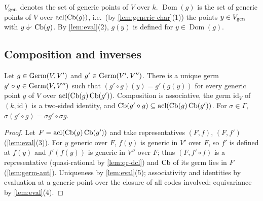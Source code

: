 \begin{definition}\label{def:dom}
$V_{\operatorname{gen}}$ denotes the set of generic points of $V$ over $k$.
$\operatorname{Dom}(g)$ is the set of generic points of $V$ over $\operatorname{acl}(\operatorname{Cb}(g))$,
i.e.\ (by \cref{lem:generic-char}(1)) the points $y\in V_{\operatorname{gen}}$ with
$y\ind{}\Cb(g)$.  By \cref{lem:eval}(2), $g(y)$ is defined for $y\in\operatorname{Dom}(g)$.
\end{definition}

\subsection{Composition and inverses}

\begin{lemma}[composition]\label{lem:comp}
Let $g\in\operatorname{Germ}(V,V')$ and $g'\in\operatorname{Germ}(V',V'')$.  There is a unique germ
$g'\circ g\in\operatorname{Germ}(V,V'')$ such that $(g'\circ g)(y)=g'(g(y))$ for every generic point
$y$ of $V$ over $\operatorname{acl}(\operatorname{Cb}(g)\operatorname{Cb}(g'))$.  Composition is associative, the germ
$\mathrm{id}_V$ of $(k,\mathrm{id})$ is a two-sided identity, and
$\operatorname{Cb}(g'\circ g)\subseteq\operatorname{acl}(\operatorname{Cb}(g)\operatorname{Cb}(g'))$.  For $\sigma\in\Gamma$,
$\sigma(g'\circ g)=\sigma g'\circ\sigma g$.
\end{lemma}
\begin{proof}
Let $F=\operatorname{acl}(\operatorname{Cb}(g)\operatorname{Cb}(g'))$ and take representatives $(F,f)$, $(F,f')$
(\cref{lem:eval}(3)).  For $y$ generic over $F$, $f(y)$ is generic in $V'$ over $F$,
so $f'$ is defined at $f(y)$ and $f'(f(y))$ is generic in $V''$ over $F$; thus
$(F,f'\circ f)$ is a representative (quasi-rational by \cref{lem:qr-dcl}) and
$\operatorname{Cb}$ of its germ lies in $F$ (\cref{lem:germ-aut}).  Uniqueness by \cref{lem:eval}(5);
associativity and identities by evaluation at a generic point over the closure of all
codes involved; equivariance by \cref{lem:eval}(4).
\end{proof}

